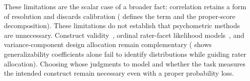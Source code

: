 These limitations are the scalar case of a broader fact: correlation retains a form of resolution and discards calibration ( defines the term and the proper-score decomposition).
These limitations do not establish that psychometric methods are unnecessary.
Construct validity~\citep{cronbach1955construct}, ordinal rater-facet likelihood models~\citep{linacre1989many}, and variance-component design allocation remain complementary ( shows generalizability coefficients alone fail to identify distributions while guiding rater allocation).
Choosing whose judgments to model and whether the task measures the intended construct remain necessary even with a proper probability loss.
